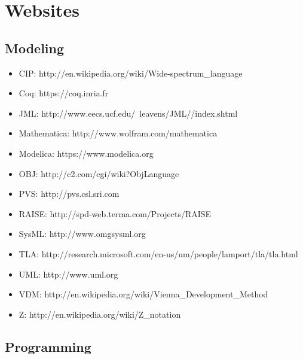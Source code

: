 
\section{Websites}

\subsection{Modeling}

\begin{itemize}
\item CIP: http://en.wikipedia.org/wiki/Wide-spectrum\_language
\item Coq: https://coq.inria.fr
\item JML: http://www.eecs.ucf.edu/~leavens/JML//index.shtml
\item Mathematica: http://www.wolfram.com/mathematica
\item Modelica: https://www.modelica.org
\item OBJ: http://c2.com/cgi/wiki?ObjLanguage
\item PVS: http://pvs.csl.sri.com
\item RAISE: http://spd-web.terma.com/Projects/RAISE
\item SysML: http://www.omgsysml.org
\item TLA: http://research.microsoft.com/en-us/um/people/lamport/tla/tla.html
\item UML: http://www.uml.org
\item VDM: http://en.wikipedia.org/wiki/Vienna\_Development\_Method
\item Z: http://en.wikipedia.org/wiki/Z\_notation
\end{itemize}

\subsection{Programming}

